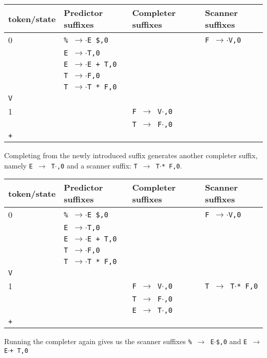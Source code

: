 \documentclass[11pt]{article}
\def\ra{\rightarrow}
\begin{document}
\begin{tabular}{|l|l|l|l|}
\hline
token/state & Predictor suffixes & Completer suffixes & Scanner suffixes\\
\hline
0     & \texttt{\% $\ra$$\cdot$E \$,0} & & \texttt{F $\ra$$\cdot$V,0}\\
      & \texttt{E $\ra$$\cdot$T,0} & & \\
      & \texttt{E $\ra$$\cdot$E + T,0} & & \\
      & \texttt{T $\ra$$\cdot$F,0} & & \\
      & \texttt{T $\ra$$\cdot$T * F,0} & & \\
\hline
\texttt{V} &  & &\\
\hline
1     &  & \texttt{F $\ra$ V$\cdot$,0}& \\
      &  & \texttt{T $\ra$ F$\cdot$,0}& \\
\hline
\texttt{+} &  & &\\
\hline
\end{tabular}

Completing from the newly introduced suffix generates another completer
suffix, namely \texttt{E $\ra$ T$\cdot$,0} and a scanner suffix: 
\texttt{T $\ra$ T$\cdot$* F,0}.

\begin{tabular}{|l|l|l|l|}
\hline
token/state & Predictor suffixes & Completer suffixes & Scanner suffixes\\
\hline
0     & \texttt{\% $\ra$$\cdot$E \$,0} & & \texttt{F $\ra$$\cdot$V,0}\\
      & \texttt{E $\ra$$\cdot$T,0} & & \\
      & \texttt{E $\ra$$\cdot$E + T,0} & & \\
      & \texttt{T $\ra$$\cdot$F,0} & & \\
      & \texttt{T $\ra$$\cdot$T * F,0} & & \\
\hline
\texttt{V} &  & &\\
\hline
1     &  & \texttt{F $\ra$ V$\cdot$,0}& \texttt{T $\ra$ T$\cdot$* F,0}\\
      &  & \texttt{T $\ra$ F$\cdot$,0}& \\
      &  & \texttt{E $\ra$ T$\cdot$,0}& \\
\hline
\texttt{+} &  & &\\
\hline
\end{tabular}

Running the completer again gives us the scanner suffixes \texttt{\%
  $\ra$ E$\cdot$\$,0} and \texttt{E $\ra$ E$\cdot$+ T,0}
\end{document}
